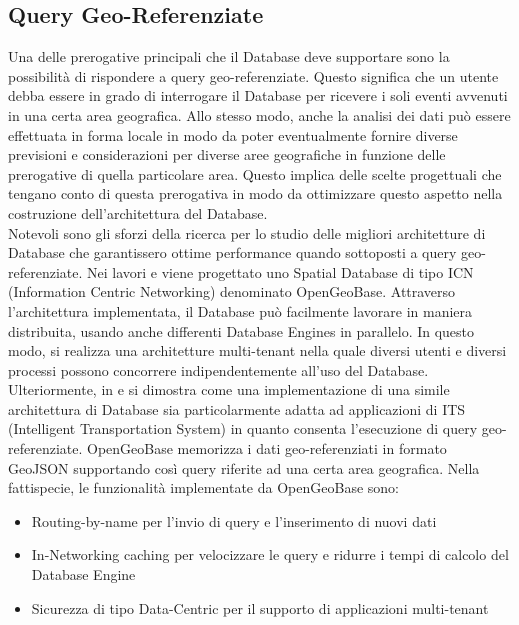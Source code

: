 \subsection{Query Geo-Referenziate}
Una delle prerogative principali che il Database deve supportare sono la possibilità di rispondere a query geo-referenziate. Questo significa che un utente debba essere in grado di interrogare il Database per ricevere i soli eventi avvenuti in una certa area geografica. Allo stesso modo, anche la analisi dei dati può essere effettuata in forma locale in modo da poter eventualmente fornire diverse previsioni e considerazioni per diverse aree geografiche in funzione delle prerogative di quella particolare area. Questo implica delle scelte progettuali che tengano conto di questa prerogativa in modo da ottimizzare questo aspetto nella costruzione dell'architettura del Database.\\
Notevoli sono gli sforzi della ricerca per lo studio delle migliori architetture di Database che garantissero ottime performance quando sottoposti a query geo-referenziate. Nei lavori \cite{famous:paper_detti_1} e \cite{famous:paper_detti_2} viene progettato uno Spatial Database di tipo ICN (Information Centric Networking) denominato OpenGeoBase. Attraverso l'architettura implementata, il Database può facilmente lavorare in maniera distribuita, usando anche differenti Database Engines in parallelo. In questo modo, si realizza una architetture multi-tenant nella quale diversi utenti e diversi processi possono concorrere indipendentemente all'uso del Database. Ulteriormente, in \cite{famous:paper_detti_1} e \cite{famous:paper_detti_3} si dimostra come una implementazione di una simile architettura di Database sia particolarmente adatta ad applicazioni di ITS (Intelligent Transportation System) in quanto consenta l'esecuzione di query geo-referenziate. OpenGeoBase memorizza i dati geo-referenziati in formato GeoJSON supportando così query riferite ad una certa area geografica. Nella fattispecie, le funzionalità implementate da OpenGeoBase sono:
\begin{itemize}
	\item Routing-by-name per l'invio di query e l'inserimento di nuovi dati
	\item In-Networking caching per velocizzare le query e ridurre i tempi di calcolo del Database Engine
	\item Sicurezza di tipo Data-Centric per il supporto di applicazioni multi-tenant
\end{itemize}

